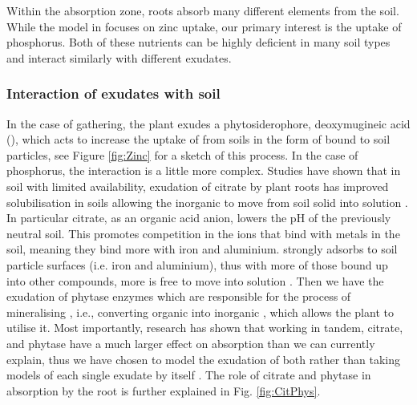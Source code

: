 \documentclass[11pt]{article}
\numberwithin{equation}{section}
\begin{document}
Within the absorption zone, roots absorb many different elements from the soil. While the model in \cite{Ptashnyk-2011} focuses on zinc uptake, our primary interest is the uptake of phosphorus. Both of these nutrients can be highly deficient in many soil types and interact similarly with different exudates.



\subsubsection{Interaction of exudates with soil}
In the case of   gathering, the plant exudes a phytosiderophore, deoxymugineic acid (), which acts to increase the uptake of  from soils in the form of  bound to soil particles, see Figure \ref{fig:Zinc} for a sketch of this process. In the case of phosphorus, the interaction is a little more complex. Studies have shown that in soil with limited  availability, exudation of citrate by plant roots has improved  solubilisation in soils
allowing the inorganic  to move from soil solid into solution \cite{McKayFletcher-2019}. In particular citrate, as an organic acid anion, lowers the pH of the previously neutral soil. This promotes competition in the ions that bind with metals in the soil, meaning they bind more with iron and aluminium.  strongly adsorbs to soil particle surfaces (i.e. iron and aluminium), thus with more of those bound up into other compounds, more  is free to move into solution \cite{McKayFletcher-2019}.
Then we have the exudation of phytase enzymes which are responsible for the process of mineralising , i.e., converting organic  into inorganic , which allows the plant to utilise it. Most importantly, research has shown that working in tandem, citrate, and phytase have a much larger effect on  absorption than we can currently explain, thus we have chosen to model the exudation of both rather than taking models of each single exudate by itself \cite{giles_george}. The role of citrate and phytase in  absorption by the root is further explained in Fig. \ref{fig:CitPhys}.
\end{document}

